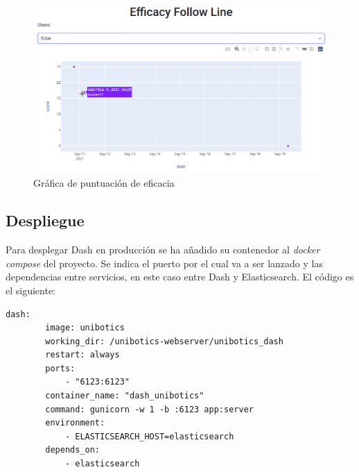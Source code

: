 \begin{figure}[H]
    \centering
    \includegraphics[width=17cm, keepaspectratio]{img/score_efficacy.png}
    \caption{Gráfica de puntuación de eficacia}
    \label{fig:score_efficacy}
\end{figure}
\subsection{Despliegue}
Para desplegar Dash en producción se ha añadido su contenedor al \textit{docker compose} del proyecto. Se indica el puerto por el cual va a ser lanzado y las dependencias entre servicios, en este caso entre Dash y Elasticsearch. El código es el siguiente:\\


\begin{lstlisting}
dash:
        image: unibotics
        working_dir: /unibotics-webserver/unibotics_dash
        restart: always
        ports:
            - "6123:6123"
        container_name: "dash_unibotics"
        command: gunicorn -w 1 -b :6123 app:server
        environment:
            - ELASTICSEARCH_HOST=elasticsearch
        depends_on:
            - elasticsearch
\end{lstlisting} 

